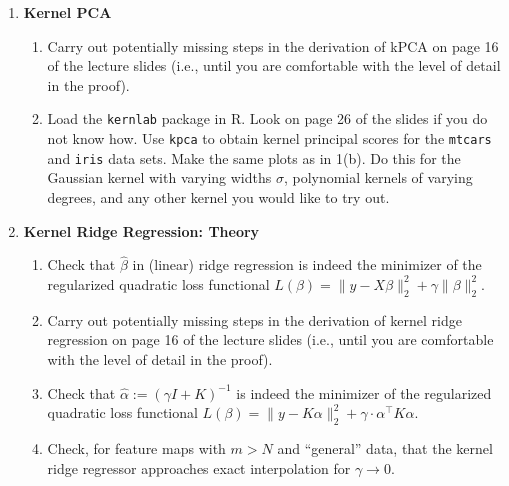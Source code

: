 \documentclass[a4paper,10pt,oneside]{article}
\begin{document}
\begin{enumerate}
\item {\bf Kernel PCA}
\begin{enumerate}
\item Carry out potentially missing steps in the derivation of kPCA on page 16 of the lecture slides (i.e., until you are comfortable with the level of detail in the proof).
\item Load the \texttt{kernlab} package in R. Look on page 26 of the slides if you do not know how. Use \texttt{kpca} to obtain kernel principal scores for the \texttt{mtcars} and \texttt{iris} data sets. Make the same plots as in 1(b). Do this for the Gaussian kernel with varying widths $\sigma$, polynomial kernels of varying degrees, and any other kernel you would like to try out.
\end{enumerate}

\item {\bf Kernel Ridge Regression: Theory}
\begin{enumerate}
\item Check that $\widehat{\beta}$ in (linear) ridge regression is indeed the minimizer of the regularized quadratic loss functional $L(\beta)= \|y - X\beta\|_2^2+\gamma\|\beta\|_2^2$.
\item Carry out potentially missing steps in the derivation of kernel ridge regression on page 16 of the lecture slides (i.e., until you are comfortable with the level of detail in the proof).
\item Check that $\widehat{\alpha}:= \left(\gamma I + K\right)^{-1}$ is indeed the minimizer of the regularized quadratic loss functional $L(\beta)= \|y - K\alpha\|_2^2+\gamma\cdot \alpha^\top K \alpha$.
\item Check, for feature maps with $m > N$ and ``general'' data, that the kernel ridge regressor approaches exact interpolation for $\gamma\rightarrow 0$.
\end{enumerate}


\end{enumerate}
\end{document}
